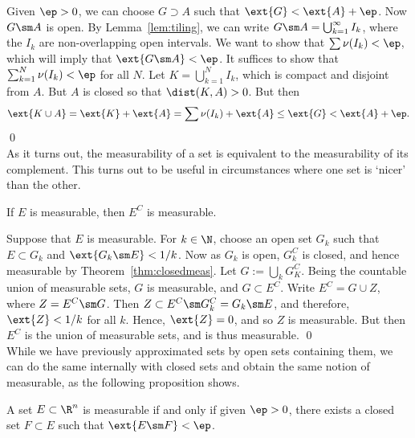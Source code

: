 \pf Given $\ep>0$, we can choose $G \supset A$ such that $\ext{G}<\ext{A}+\ep$. Now $G \sm A$ is open. By Lemma~\ref{lem:tiling}, we can write $G\sm A=\bigcup_{k=1}^\infty I_k$, where the $I_k$ are non-overlapping open intervals. We want to show that $\sum \nu(I_k)<\ep$, which will imply that $\ext{G \sm A}<\ep$. It suffices to show that $\sum_{k=1}^N \nu(I_k)<\ep$ for all $N$. Let $K= \bigcup_{k=1}^N I_k$, which is compact and disjoint from $A$. But $A$ is closed so that $\dist(K,A)>0$. But then 
	\[
	\ext{K \cup A}=\ext{K}+\ext{A}= \sum \nu(I_k) + \ext{A} \leq \ext{G} < \ext{A} + \ep.
	\] \qed \\


As it turns out, the measurability of a set is equivalent to the measurability of its complement. This turns out to be useful in circumstances where one set is `nicer' than the other. 


\begin{thm}
If $E$ is measurable, then $E^C$ is measurable.
\end{thm}

\pf Suppose that $E$ is measurable. For $k \in \N$, choose an open set $G_k$ such that $E \subset G_k$ and $\ext{G_k \sm E}<1/k$. Now as $G_k$ is open, $G_k^C$ is closed, and hence measurable by Theorem~\ref{thm:closedmeas}. Let $G:= \bigcup_k G_K^C$. Being the countable union of measurable sets, $G$ is measurable, and $G \subset E^C$. Write $E^C= G \cup Z$, where $Z= E^C \sm G$. Then $Z \subset E^C \sm G_k^C= G_k \sm E$, and therefore, $\ext{Z}< 1/k$ for all $k$. Hence, $\ext{Z}=0$, and so $Z$ is measurable. But then $E^C$ is the union of measurable sets, and is thus measurable. \qed \\


While we have previously approximated sets by open sets containing them, we can do the same internally with closed sets and obtain the same notion of measurable, as the following proposition shows.


\begin{prop} \label{prop:nearclosedmeas}
A set $E \subset \R^n$ is measurable if and only if given $\ep>0$, there exists a closed set $F \subset E$ such that $\ext{E \sm F}< \ep$. 
\end{prop}

